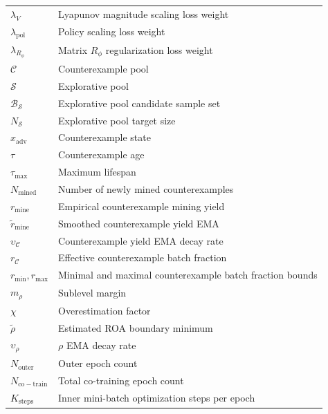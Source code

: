 \begin{longtable}{@{} p{} p{} @{}}
$\lambda_V$ & Lyapunov magnitude scaling loss weight \\
$\lambda_{\mathrm{pol}}$ & Policy scaling loss weight \\
$\lambda_{R_\phi}$ & Matrix $R_\phi$ regularization loss weight \\
$\mathcal{C}$ & Counterexample pool \\
$\mathcal{S}$ & Explorative pool \\
$\mathcal{B}_{\mathcal{S}}$ & Explorative pool candidate sample set \\
$N_{\mathcal{S}}$ & Explorative pool target size \\
$x_{\mathrm{adv}}$ & Counterexample state \\
$\tau$ & Counterexample age \\
$\tau_{\max}$ & Maximum lifespan \\
$N_{\mathrm{mined}}$ & Number of newly mined counterexamples \\
$r_{\mathrm{mine}}$ & Empirical counterexample mining yield \\
$\tilde{r}_{\mathrm{mine}}$ & Smoothed counterexample yield EMA \\
$\upsilon_{\mathcal{C}}$ & Counterexample yield EMA decay rate \\
$r_{\mathcal{C}}$ & Effective counterexample batch fraction \\
$r_{\min}, r_{\max}$ & Minimal and maximal counterexample batch fraction bounds \\
$m_\rho$ & Sublevel margin \\
$\chi$ & Overestimation factor \\
$\tilde{\rho}$ & Estimated ROA boundary minimum \\
$\upsilon_\rho$ & $\rho$ EMA decay rate \\
$N_{\mathrm{outer}}$ & Outer epoch count \\
$N_{\mathrm{co-train}}$ & Total co-training epoch count \\
$K_{\mathrm{steps}}$ & Inner mini-batch optimization steps per epoch \\
\midrule


\end{longtable}
